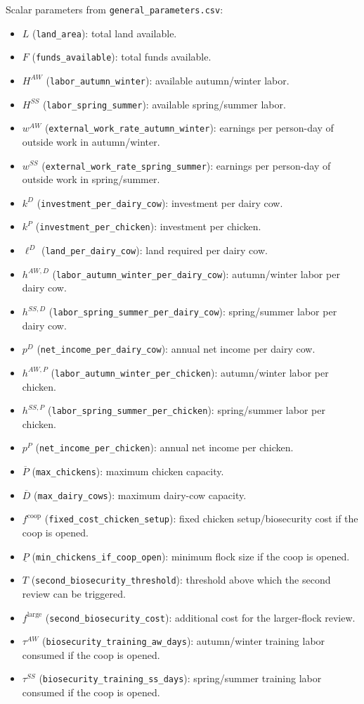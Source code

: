 Scalar parameters from \texttt{general\_parameters.csv}:
\begin{itemize}
\item \(L\) (\texttt{land\_area}): total land available.
\item \(F\) (\texttt{funds\_available}): total funds available.
\item \(H^{AW}\) (\texttt{labor\_autumn\_winter}): available autumn/winter labor.
\item \(H^{SS}\) (\texttt{labor\_spring\_summer}): available spring/summer labor.
\item \(w^{AW}\) (\texttt{external\_work\_rate\_autumn\_winter}): earnings per person-day of outside work in autumn/winter.
\item \(w^{SS}\) (\texttt{external\_work\_rate\_spring\_summer}): earnings per person-day of outside work in spring/summer.
\item \(k^D\) (\texttt{investment\_per\_dairy\_cow}): investment per dairy cow.
\item \(k^P\) (\texttt{investment\_per\_chicken}): investment per chicken.
\item \(\ell^D\) (\texttt{land\_per\_dairy\_cow}): land required per dairy cow.
\item \(h^{AW,D}\) (\texttt{labor\_autumn\_winter\_per\_dairy\_cow}): autumn/winter labor per dairy cow.
\item \(h^{SS,D}\) (\texttt{labor\_spring\_summer\_per\_dairy\_cow}): spring/summer labor per dairy cow.
\item \(p^D\) (\texttt{net\_income\_per\_dairy\_cow}): annual net income per dairy cow.
\item \(h^{AW,P}\) (\texttt{labor\_autumn\_winter\_per\_chicken}): autumn/winter labor per chicken.
\item \(h^{SS,P}\) (\texttt{labor\_spring\_summer\_per\_chicken}): spring/summer labor per chicken.
\item \(p^P\) (\texttt{net\_income\_per\_chicken}): annual net income per chicken.
\item \(\overline P\) (\texttt{max\_chickens}): maximum chicken capacity.
\item \(\overline D\) (\texttt{max\_dairy\_cows}): maximum dairy-cow capacity.
\item \(f^{\text{coop}}\) (\texttt{fixed\_cost\_chicken\_setup}): fixed chicken setup/biosecurity cost if the coop is opened.
\item \(\underline P\) (\texttt{min\_chickens\_if\_coop\_open}): minimum flock size if the coop is opened.
\item \(T\) (\texttt{second\_biosecurity\_threshold}): threshold above which the second review can be triggered.
\item \(f^{\text{large}}\) (\texttt{second\_biosecurity\_cost}): additional cost for the larger-flock review.
\item \(\tau^{AW}\) (\texttt{biosecurity\_training\_aw\_days}): autumn/winter training labor consumed if the coop is opened.
\item \(\tau^{SS}\) (\texttt{biosecurity\_training\_ss\_days}): spring/summer training labor consumed if the coop is opened.
\end{itemize}

